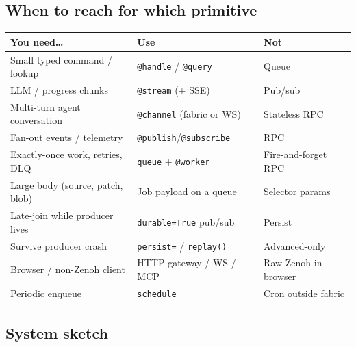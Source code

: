 \documentclass[11pt,a4paper]{article}
\begin{document}
\subsection{When to reach for which primitive}

\begin{center}
\begin{tabularx}{\textwidth}{@{}>{\raggedright\arraybackslash}p{}
  >{\raggedright\arraybackslash}X
  >{\raggedright\arraybackslash}p{}@{}}
\toprule
\textbf{You need\ldots} & \textbf{Use} & \textbf{Not} \\
\midrule
Small typed command / lookup & \texttt{@handle} / \texttt{@query} & Queue \\
LLM / progress chunks & \texttt{@stream} (+ SSE) & Pub/sub \\
Multi-turn agent conversation & \texttt{@channel} (fabric or WS) & Stateless RPC \\
Fan-out events / telemetry & \texttt{@publish}/\texttt{@subscribe} & RPC \\
Exactly-once work, retries, DLQ & \texttt{queue} + \texttt{@worker} & Fire-and-forget RPC \\
Large body (source, patch, blob) & Job payload on a queue & Selector params \\
Late-join while producer lives & \texttt{durable=True} pub/sub & Persist \\
Survive producer crash & \texttt{persist=} / \texttt{replay()} & Advanced-only \\
Browser / non-Zenoh client & HTTP gateway / WS / MCP & Raw Zenoh in browser \\
Periodic enqueue & \texttt{schedule} & Cron outside fabric \\
\bottomrule
\end{tabularx}
\end{center}

\subsection{System sketch}
\end{document}
